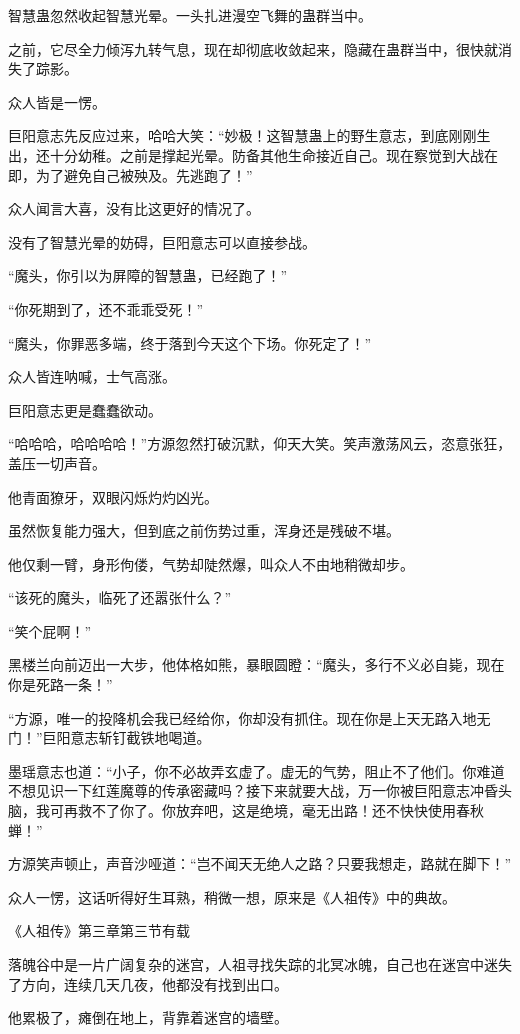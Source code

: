 \begin{this_body}
智慧蛊忽然收起智慧光晕。一头扎进漫空飞舞的蛊群当中。

之前，它尽全力倾泻九转气息，现在却彻底收敛起来，隐藏在蛊群当中，很快就消失了踪影。

众人皆是一愣。

巨阳意志先反应过来，哈哈大笑：“妙极！这智慧蛊上的野生意志，到底刚刚生出，还十分幼稚。之前是撑起光晕。防备其他生命接近自己。现在察觉到大战在即，为了避免自己被殃及。先逃跑了！”

众人闻言大喜，没有比这更好的情况了。

没有了智慧光晕的妨碍，巨阳意志可以直接参战。

“魔头，你引以为屏障的智慧蛊，已经跑了！”

“你死期到了，还不乖乖受死！”

“魔头，你罪恶多端，终于落到今天这个下场。你死定了！”

众人皆连呐喊，士气高涨。

巨阳意志更是蠢蠢欲动。

“哈哈哈，哈哈哈哈！”方源忽然打破沉默，仰天大笑。笑声激荡风云，恣意张狂，盖压一切声音。

他青面獠牙，双眼闪烁灼灼凶光。

虽然恢复能力强大，但到底之前伤势过重，浑身还是残破不堪。

他仅剩一臂，身形佝偻，气势却陡然爆，叫众人不由地稍微却步。

“该死的魔头，临死了还嚣张什么？”

“笑个屁啊！”

黑楼兰向前迈出一大步，他体格如熊，暴眼圆瞪：“魔头，多行不义必自毙，现在你是死路一条！”

“方源，唯一的投降机会我已经给你，你却没有抓住。现在你是上天无路入地无门！”巨阳意志斩钉截铁地喝道。

墨瑶意志也道：“小子，你不必故弄玄虚了。虚无的气势，阻止不了他们。你难道不想见识一下红莲魔尊的传承密藏吗？接下来就要大战，万一你被巨阳意志冲昏头脑，我可再救不了你了。你放弃吧，这是绝境，毫无出路！还不快快使用春秋蝉！”

方源笑声顿止，声音沙哑道：“岂不闻天无绝人之路？只要我想走，路就在脚下！”

众人一愣，这话听得好生耳熟，稍微一想，原来是《人祖传》中的典故。

《人祖传》第三章第三节有载

落魄谷中是一片广阔复杂的迷宫，人祖寻找失踪的北冥冰魄，自己也在迷宫中迷失了方向，连续几天几夜，他都没有找到出口。

他累极了，瘫倒在地上，背靠着迷宫的墙壁。


\end{this_body}
